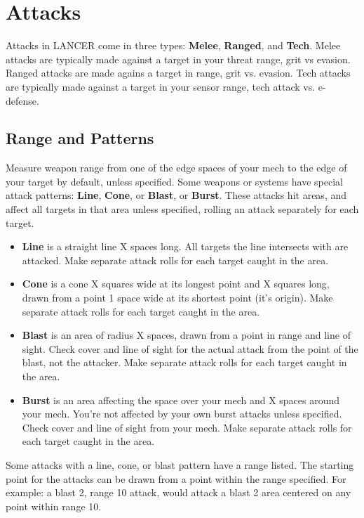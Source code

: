 \section{Attacks}
Attacks in LANCER come in three types: \textbf{Melee}, \textbf{Ranged}, and \textbf{Tech}. Melee attacks are typically made against a target in your threat range, grit vs evasion. Ranged attacks are made agains a target in range, grit vs. evasion. Tech attacks are typically made against a target in your sensor range, tech attack vs. e-defense.

\subsection{Range and Patterns}
Measure weapon range from one of the edge spaces of your mech to the edge of your target by default, unless specified.
Some weapons or systems have special attack patterns: \textbf{Line}, \textbf{Cone}, or \textbf{Blast}, or \textbf{Burst}. These attacks hit areas, and affect all targets in that area unless specified, rolling an attack separately for each target.
\begin{itemize}
\item \textbf{Line} is a straight line X spaces long. All targets the line intersects with are attacked. Make separate attack rolls for each target caught in the area.
\item \textbf{Cone} is a cone X squares wide at its longest point and X squares long, drawn from a point 1 space wide at its shortest point (it's origin). Make separate attack rolls for each target caught in the area.
\item \textbf{Blast} is an area of radius X spaces, drawn from a point in range and line of sight. Check cover and line of sight for the actual attack from the point of the blast, not the attacker. Make separate attack rolls for each target caught in the area.
\item \textbf{Burst} is an area affecting the space over your mech and X spaces around your mech. You're not affected by your own burst attacks unless specified. Check cover and line of sight from your mech. Make separate attack rolls for each target caught in the area.
\end{itemize}

Some attacks with a line, cone, or blast pattern have a range listed. The starting point for the attacks can be drawn from a point within the range specified. For example: a blast 2, range 10 attack, would attack a blast 2 area centered on any point within range 10.

